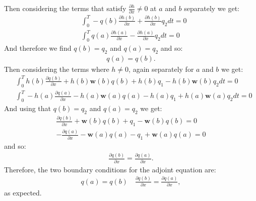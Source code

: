 \documentclass[11pt, a4paper]{article}
\theoremstyle{definition}
\newcommand{\w}{\mathbf{w}}
\begin{document}
Then considering the terms that satisfy $\frac{\partial h}{\partial x} \neq 0$ at $a$ and $b$ separately we get:
\begin{align*}
	&\int_0^T -q(b) \frac{\partial h(b)}{\partial x} + \frac{\partial h(b)}{\partial x} q_2 dt= 0\\
	& \int_0^T q(a) \frac{\partial h (a)}{\partial x} - \frac{\partial h(a)}{\partial x}q_2 dt =0
\end{align*}
	And therefore we find $q(b) = q_2$ and $q(a) = q_2$ and so: 
	\begin{align*}
		q(a) = q(b).
	\end{align*}
Then considering the terms where $h \neq 0$, again separately for $a$ and $b$ we get:
\begin{align*}
	&\int_0^T  h(b)\frac{\partial q(b)}{\partial x} + h(b) \w(b) q(b) + h(b)q_1 - h(b)\w(b)q_2 dt = 0\\
	&\int_0^T - h(a)\frac{\partial q(a)}{\partial x} - h(a) \w(a) q(a) - h(a)q_1 + h(a)\w(a)q_2 dt = 0
\end{align*}
	And using that $q(b) = q_2$ and $q(a) = q_2$ we get:
	\begin{align*}
		\frac{\partial q(b)}{\partial x} + \w(b) q(b) + q_1 - \w(b)q(b)  = 0\\
		- \frac{\partial q(a)}{\partial x} - \w(a) q(a) - q_1 + \w(a)q(a)  = 0
	\end{align*}
	and so:
	\begin{align*}
		\frac{\partial q(b)}{\partial x}  = \frac{\partial q(a)}{\partial x}. 
	\end{align*}
	Therefore, the two boundary conditions for the adjoint equation are:
	\begin{align*}
		q(a) = q(b) \quad \frac{\partial q(b)}{\partial x}  = \frac{\partial q(a)}{\partial x},
	\end{align*}
	as expected.
	
	
	
	
\end{document}
